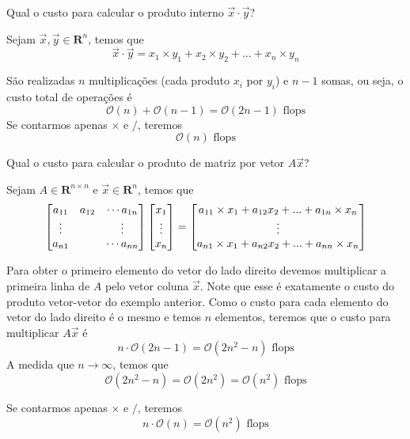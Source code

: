 \begin{ex}
Qual o custo para calcular o produto interno $\vec{x}\cdot\vec{y}$?
\end{ex}
\begin{sol}
Sejam $\vec{x}, \vec{y} \in \mathbf{R}^n$, temos que
\begin{equation}
  \vec{x}\cdot\vec{y} = x_1 \times y_1 + x_2\times y_2 + ... +x_n\times y_n
\end{equation}

São realizadas $n$ multiplicações (cada produto $x_i$ por $y_i$) e $n-1$ somas, ou seja, o custo total de operações é
\begin{equation}
  \mathcal{O}(n)+\mathcal{O}(n-1) = \mathcal{O}(2n-1)  \text{~flops}
\end{equation}
Se contarmos apenas $\times$ e $/$, teremos
\begin{equation}
  \mathcal{O}(n) \text{ flops}
\end{equation}
\end{sol}


\begin{ex}
Qual o custo para calcular o produto de matriz por vetor $A \vec{x}$?
\end{ex}
\begin{sol}
 Sejam $A \in \mathbf{R}^{n\times n}$ e $\vec{x} \in \mathbf{R}^n$, temos que
\begin{equation}
  \begin{bmatrix} a_{11}&a_{12}&\cdots a_{1n} \\ \vdots&&\vdots \\ a_{n1}&&\cdots a_{nn} \end{bmatrix} \begin{bmatrix} x_1 \\ \vdots \\ x_n \end{bmatrix}
  =\begin{bmatrix}  a_{11}\times x_1 + a_{12}x_2 +...+a_{1n}\times x_n  \\ \vdots \\ a_{n1}\times x_1 + a_{n2}x_2 +...+a_{nn}\times x_n \end{bmatrix} 
\end{equation}

Para obter o primeiro elemento do vetor do lado direito devemos multiplicar a  primeira linha de $A$ pelo vetor coluna $\vec{x}$. Note que esse é exatamente o custo do produto vetor-vetor do exemplo anterior. Como o custo para cada elemento do vetor do lado direito é o mesmo e temos $n$ elementos, teremos que o custo para multiplicar $A \vec{x}$ é
\begin{equation}
  n \cdot \mathcal{O}( 2n-1) = \mathcal{O}(2n^2-n) \text{~flops}
\end{equation}
A medida que $n \rightarrow \infty$, temos que 
\begin{equation}
  \mathcal{O}(2n^2-n) =\mathcal{O}(2n^2)=\mathcal{O}(n^2) \text{~flops}
\end{equation}

Se contarmos apenas $\times$ e $/$, teremos
\begin{equation}
  n\cdot \mathcal{O}(n) = \mathcal{O}(n^2) \text{~flops}
\end{equation}
\end{sol}

